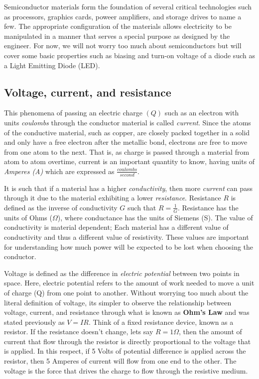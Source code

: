 \documentclass[12pt]{article}
\begin{document}
Semiconductor materials form the foundation of several critical technologies such as processors, graphics cards, poweer amplifiers, and storage drives to name a few. The appropriate configuration of the materials allows electricity to be manipulated in a manner that serves a special purpose as designed by the engineer. For now, we will not worry too much about semiconductors but will cover some basic properties such as biasing and turn-on voltage of a diode such as a Light Emitting Diode (LED).

\subsection{Voltage, current, and resistance}
This phenomena of passing an electric charge $(Q)$ such as an electron with units \textit{coulombs} through the conductor material is called \textit{current}. Since the atoms of the conductive material, such as copper, are closely packed together in a solid and only have a free electron after the metallic bond, electrons are free to move from one atom to the next. That is, as charge is passed through a material from atom to atom overtime, current is an important quantity to know, having units of \textit{Amperes (A)} which are expressed as $\frac{coulombs}{second}$. 

It is such that if a material has a higher \textit{conductivity}, then more \textit{current} can pass through it due to the material exhibiting a lower \textit{resistance}. Resistance $R$ is defined as the inverse of conductivity $G$ such that $R = \frac{1}{G}$. Resistance has the units of Ohms ($\Omega$), where conductance has the units of Siemens (S). The value of conductivity is material dependent; Each material has a different value of conductivity and thus a different value of resistivity. These values are important for understanding how much power will be expected to be lost when choosing the conductor.

 Voltage is defined as the difference in \textit{electric potential} between two points in space. Here, electric potential refers to the amount of work needed to move a unit of charge (Q) from one point to another. Without worrying too much about the literal definition of voltage, its simpler to observe the relationship between voltage, current, and resistance through what is known as \textbf{Ohm's Law} and was stated previously as $V = IR$.
Think of a fixed resistance device, known as a resistor. If the resistance doesn't change, lets say $R = 1 \Omega$, then the amount of current that flow through the resistor is directly proportional to the voltage that is applied. In this respect, if 5 Volts of potential difference is applied across the resistor, then 5 Amperes of current will flow from one end to the other. The voltage is the force that drives the charge to flow through the resistive medium. 
\end{document}
